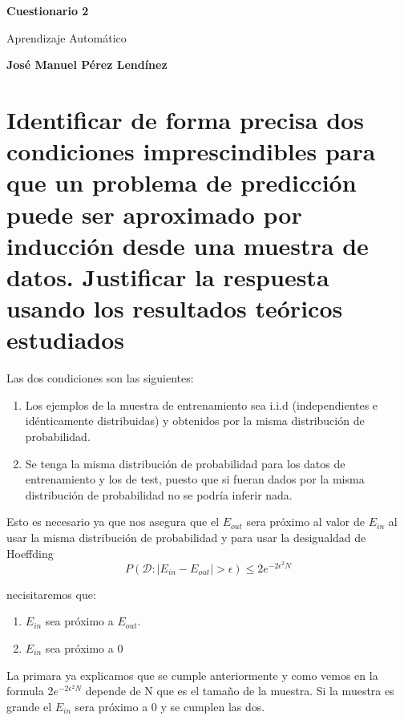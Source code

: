 \documentclass[titlepage]{article}
\begin{document}
	\begin{titlepage}
		\begin{center}
			\vspace*{1cm}
			\date{} %
			\Huge
			\textbf{Cuestionario 2}
			
			\vspace{0.5cm}
			\LARGE
			Aprendizaje Automático
			
			\vspace{1.5cm}
			
			\textbf{José Manuel Pérez Lendínez}
			

			
		\end{center}
	\end{titlepage}	
	\newpage
	\section{Identificar de forma precisa dos condiciones imprescindibles para que un problema de predicción puede ser aproximado por inducción desde una muestra de datos. Justificar la respuesta usando los resultados teóricos estudiados}	
	Las dos condiciones son las siguientes:
	\begin{enumerate}
		\item Los ejemplos de la muestra de entrenamiento sea i.i.d (independientes e idénticamente distribuidas) y obtenidos por la misma distribución de probabilidad. 
		\item Se tenga la misma distribución de probabilidad para los datos de entrenamiento y los de test, puesto que si fueran dados por la misma distribución de probabilidad no se podría inferir nada.
	\end{enumerate}
		Esto es necesario ya que nos asegura que el $E_{out}$ sera próximo al valor de $E_{in}$ al usar la misma distribución de probabilidad y para usar la desigualdad de Hoeffding 
		$$
		P(\mathcal{D} :|E_{in}-E_{out}|>\epsilon) \leq 2 e^{-2 \epsilon^{2} N}
		$$
		
		necisitaremos que:
		\begin{enumerate}
			\item $E_{in}$ sea próximo a $E_{out}$.
			\item $E_{in}$ sea próximo a 0
		\end{enumerate}
	
		La primara ya explicamos que se cumple anteriormente y como vemos en la formula 2$e^{-2 \epsilon^{2} N}$ depende de N que es el tamaño de la muestra. Si la muestra es grande el $E_{in}$ sera próximo a 0 y se cumplen las dos.
	
\end{document}
